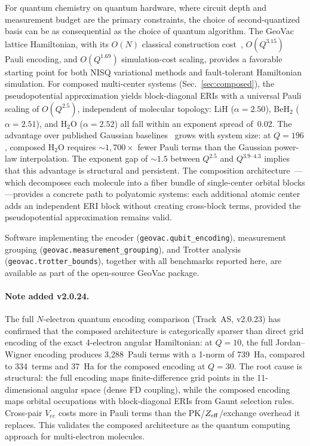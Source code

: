 \documentclass[aps,pra,twocolumn,superscriptaddress,longbibliography]{revtex4-2}
\begin{document}
For quantum chemistry on quantum hardware, where circuit depth and
measurement budget are the primary constraints, the choice of
second-quantized basis can be as consequential as the choice of quantum
algorithm.  The GeoVac lattice Hamiltonian, with its $O(N)$ classical
construction cost~\cite{loutey_paper7}, $O(Q^{3.15})$ Pauli encoding,
and $O(Q^{1.69})$ simulation-cost scaling, provides a favorable
starting point for both NISQ variational methods and fault-tolerant
Hamiltonian simulation.  For composed multi-center systems (Sec.~\ref{sec:composed}), the
pseudopotential approximation yields block-diagonal ERIs with a
universal Pauli scaling of $O(Q^{2.5})$, independent of molecular
topology: LiH ($\alpha = 2.50$), BeH$_2$ ($\alpha = 2.51$), and
H$_2$O ($\alpha = 2.52$) all fall within an exponent spread of~0.02.
The advantage over published Gaussian baselines~\cite{trenev2025}
grows with system size: at $Q = 196$, composed H$_2$O requires
$\sim 1{,}700\times$ fewer Pauli terms than the Gaussian power-law
interpolation.  The exponent gap of $\sim 1.5$ between $Q^{2.5}$
and $Q^{3.9\text{--}4.3}$ implies that this advantage is structural
and persistent.  The composition
architecture~\cite{loutey_paper17}---which decomposes each molecule
into a fiber bundle of single-center orbital blocks---provides a
concrete path to polyatomic systems: each additional atomic center
adds an independent ERI block without creating cross-block terms,
provided the pseudopotential approximation remains valid.

Software implementing the encoder
(\texttt{geovac.qubit\_encoding}), measurement grouping
(\texttt{geovac.measurement\_grouping}), and Trotter analysis
(\texttt{geovac.trotter\_bounds}), together with all benchmarks
reported here, are available as part of the open-source GeoVac package.

\paragraph{Note added v2.0.24.}
The full $N$-electron quantum encoding comparison (Track~AS,
v2.0.23) has confirmed that the composed architecture is categorically
sparser than direct grid encoding of the exact 4-electron angular
Hamiltonian: at $Q = 10$, the full Jordan--Wigner encoding produces
3{,}288~Pauli terms with a 1-norm of 739~Ha, compared to
334~terms and 37~Ha for the composed encoding at $Q = 30$.
The root cause is structural: the full encoding maps finite-difference
grid points in the 11-dimensional angular space (dense FD coupling),
while the composed encoding maps orbital occupations with
block-diagonal ERIs from Gaunt selection rules.  Cross-pair $V_{ee}$
costs more in Pauli terms than the PK/$Z_{\rm eff}$/exchange overhead
it replaces.  This validates the composed architecture as the quantum
computing approach for multi-electron molecules.
\end{document}

